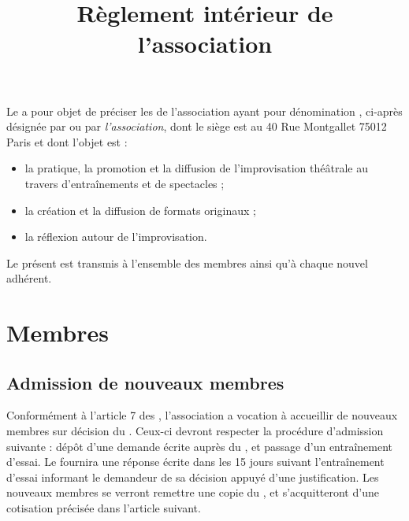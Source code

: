 \documentclass[a4paper,french,10pt]{article}
\title{Règlement intérieur de l'association \metae{}}
\begin{document}
\date{}

\maketitle 
\pagestyle{fancy} 


\rhead{\thepage} 
\cfoot{} 


\setcounter{article}{1}

Le \RI{} a pour objet de préciser les \statuts{} de l'association ayant pour dénomination \textit{\metae{}}, ci-après désignée par \textit{\meta{}} ou par \textit{l'association}, dont le siège est au 40 Rue Montgallet 75012 Paris et dont l'objet est :
\begin{itemize}
\item la pratique, la promotion et la diffusion de l'improvisation théâtrale au travers d'entraînements et de spectacles ;
\item la création et la diffusion de formats originaux ;
\item la réflexion autour de l'improvisation.
\end{itemize}

Le présent \RI{} est transmis à l'ensemble des membres ainsi qu'à chaque nouvel adhérent.

\section{Membres}

\subsection{Admission de nouveaux membres}

Conformément à l'article 7 des \statuts{}, l'association \meta{} a vocation à accueillir de nouveaux membres sur décision du \bureau{}. Ceux-ci devront respecter la procédure d'admission suivante : dépôt d'une demande écrite auprès du \bureau{}, et passage d'un entraînement d'essai. Le \bureau{} fournira une réponse écrite dans les 15 jours suivant l'entraînement d'essai informant le demandeur de sa décision appuyé d'une justification. Les nouveaux membres se verront remettre une copie du \RI{}, et s'acquitteront d'une cotisation précisée dans l'article suivant.
\end{document}
